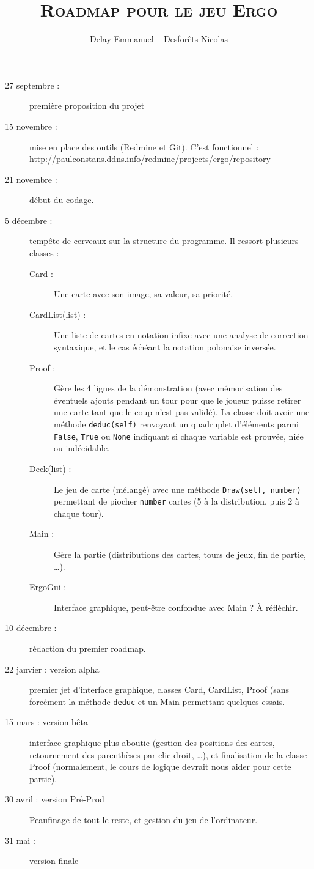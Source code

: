 \documentclass[12pt]{cours}
\title{\textbf{\textsc{Roadmap pour le jeu Ergo}}}
\author{Delay Emmanuel -- Desforêts Nicolas}
\begin{document}
\maketitle

\begin{description}
\item[27 septembre :] première proposition du projet
\item[15 novembre :] mise en place des outils (Redmine et Git). C'est fonctionnel : \url{http://paulconstans.ddns.info/redmine/projects/ergo/repository}
\item[21 novembre :] début du codage.
\item[5 décembre :] tempête de cerveaux sur la structure du programme. Il ressort plusieurs classes :

\begin{description}
\item[Card :] Une carte avec son image, sa valeur, sa priorité.
\item[CardList(list) :] Une liste de cartes en notation infixe avec une analyse de correction syntaxique, et le cas échéant la notation polonaise inversée.
\item[Proof : ] Gère les 4 lignes de la démonstration (avec mémorisation des éventuels ajouts pendant un tour pour que le joueur puisse retirer une carte tant que le coup n'est pas validé). La classe doit avoir une méthode \texttt{deduc(self)} renvoyant un quadruplet d'éléments parmi \texttt{False}, \texttt{True} ou \texttt{None} indiquant si chaque variable est prouvée, niée ou indécidable.
\item[Deck(list) :] Le jeu de carte (mélangé) avec une méthode \texttt{Draw(self, number)} permettant de piocher \texttt{number} cartes (5 à la distribution, puis 2 à chaque tour).
\item[Main :] Gère la partie (distributions des cartes, tours de jeux, fin de partie, \dots).
\item[ErgoGui :] Interface graphique, peut-être confondue avec Main ? À réfléchir.
\end{description}
\item[10 décembre :] rédaction du premier roadmap.
\item[22 janvier : version alpha]  premier jet d'interface graphique, classes Card, CardList, Proof (sans forcément la méthode \texttt{deduc} et un Main permettant quelques essais.
\item[15 mars : version bêta] interface graphique plus aboutie (gestion des positions des cartes, retournement des parenthèses par clic droit, \dots), et finalisation de la classe Proof (normalement, le cours de logique devrait nous aider pour cette partie).
\item[30 avril : version Pré-Prod] Peaufinage de tout le reste, et gestion du jeu de l'ordinateur.
\item[31 mai :] version finale
\end{description}
\end{document}
